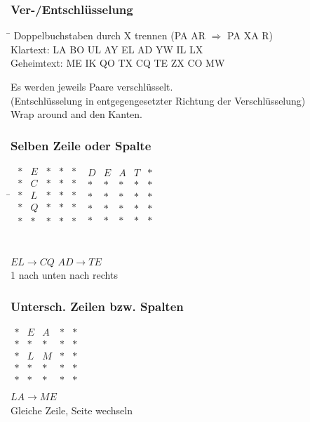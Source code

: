 \documentclass[landscape,twocolumn,a4paper]{article}
\begin{document}
\subsubsection{Ver-/Entschlüsselung}
\begin{tabbing}
\hspace{16em} \= \kill
Doppelbuchstaben durch X trennen \> (PA AR $\Rightarrow$ PA XA R)\\
Klartext:  \>  LA BO UL AY EL AD YW IL LX \\
Geheimtext: \> ME IK QO TX CQ TE ZX CO MW \\
\end{tabbing}
Es werden jeweils Paare verschlüsselt.\\
(Entschlüsselung in entgegengesetzter Richtung der Verschlüsselung)\\
Wrap around and den Kanten.
\begin{multicols}{2}
\subsubsection*{Selben Zeile oder Spalte}
\begin{tabbing}
\hspace{10em} \= \kill
$\begin{matrix}
* & E & * & * & * \\
* & C & * & * & * \\
* & L & * & * & * \\
* & Q & * & * & * \\
* & * & * & * & * \\
\end{matrix}$ 
\>
$\begin{matrix}
D & E & A & T & * \\
* & * & * & * & * \\
* & * & * & * & * \\
* & * & * & * & * \\
* & * & * & * & * \\
\end{matrix}$

\\ 
$ EL \rightarrow CQ$\> $AD \rightarrow TE $ \\
1 nach unten nach rechts
\end{tabbing} 
\subsubsection*{Untersch. Zeilen bzw. Spalten}
$\begin{matrix}
* & E & A & * & * \\
* & * & * & * & * \\
* & L & M & * & * \\
* & * & * & * & * \\
* & * & * & * & * \\
\end{matrix}$\\
$LA \rightarrow ME$\\
Gleiche Zeile, Seite wechseln
\end{multicols}
\end{document}
